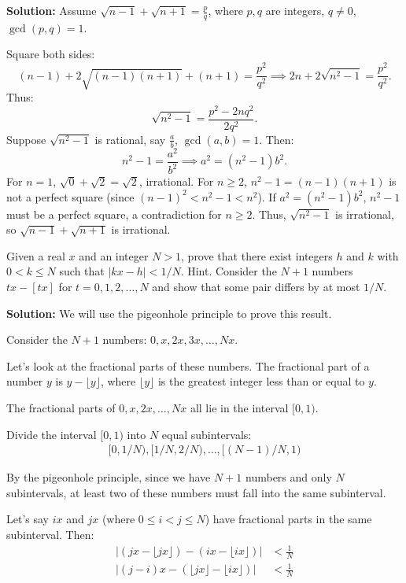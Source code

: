 \textbf{Solution:}
Assume $\sqrt{n - 1} + \sqrt{n + 1} = \frac{p}{q}$, where $p, q$ are integers, $q \neq 0$, $\gcd(p, q) = 1$.

Square both sides:
\[
(n - 1) + 2\sqrt{(n - 1)(n + 1)} + (n + 1) = \frac{p^2}{q^2} \implies 2n + 2\sqrt{n^2 - 1} = \frac{p^2}{q^2}.
\]
Thus:
\[
\sqrt{n^2 - 1} = \frac{p^2 - 2n q^2}{2 q^2}.
\]
Suppose $\sqrt{n^2 - 1}$ is rational, say $\frac{a}{b}$, $\gcd(a, b) = 1$. Then:
\[
n^2 - 1 = \frac{a^2}{b^2} \implies a^2 = (n^2 - 1)b^2.
\]
For $n = 1$, $\sqrt{0} + \sqrt{2} = \sqrt{2}$, irrational. For $n \geq 2$, $n^2 - 1 = (n - 1)(n + 1)$ is not a perfect square (since $(n - 1)^2 < n^2 - 1 < n^2$). If $a^2 = (n^2 - 1)b^2$, $n^2 - 1$ must be a perfect square, a contradiction for $n \geq 2$. Thus, $\sqrt{n^2 - 1}$ is irrational, so $\sqrt{n - 1} + \sqrt{n + 1}$ is irrational.

\begin{problembox}
Given a real $x$ and an integer $N > 1$, prove that there exist integers $h$ and $k$ with $0 < k \leq N$ such that $|kx - h| < 1/N$. Hint. Consider the $N+1$ numbers $tx-[tx]$ for $t=0,1,2,\dots,N$ and show that some pair differs by at most $1/N$.
\end{problembox}

\textbf{Solution:}
We will use the pigeonhole principle to prove this result.

Consider the $N + 1$ numbers: $0, x, 2x, 3x, \ldots, Nx$.

Let's look at the fractional parts of these numbers. The fractional part of a number $y$ is $y - \lfloor y \rfloor$, where $\lfloor y \rfloor$ is the greatest integer less than or equal to $y$.

The fractional parts of $0, x, 2x, \ldots, Nx$ all lie in the interval $[0, 1)$.

Divide the interval $[0, 1)$ into $N$ equal subintervals:
\begin{align*}
[0, 1/N), [1/N, 2/N), \ldots, [(N-1)/N, 1)
\end{align*}

By the pigeonhole principle, since we have $N + 1$ numbers and only $N$ subintervals, at least two of these numbers must fall into the same subinterval.

Let's say $ix$ and $jx$ (where $0 \leq i < j \leq N$) have fractional parts in the same subinterval. Then:
\begin{align*}
|(jx - \lfloor jx \rfloor) - (ix - \lfloor ix \rfloor)| &< \frac{1}{N} \\
|(j - i)x - (\lfloor jx \rfloor - \lfloor ix \rfloor)| &< \frac{1}{N}
\end{align*}

